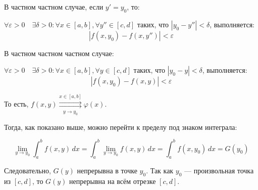 \documentclass{article}
\begin{document}
В частном частном случае, если $y' = y_0$, то:

$\forall \varepsilon > 0 \quad \exists \delta > 0 : \forall x \in [a,b], \forall y'' \in [c,d]$ таких, что $|y_0 - y''| < \delta$, выполняется:
\[
|f(x,y_0) - f(x,y'')| < \varepsilon
\]

В частном частном частном случае:

$\forall \varepsilon > 0 \quad \exists \delta > 0 : \forall x \in [a,b], \forall y \in [c,d]$ таких, что $|y_0 - y| < \delta$, выполняется:
\[
|f(x,y_0) - f(x,y)| < \varepsilon
\]

То есть, \quad $f(x, y) \mathop{\rightrightarrows}\limits^{ x \in [a, b]}_{\,y \to y_0\,} \varphi(x)$.

Тогда, как показано выше, можно перейти к пределу под знаком интеграла:

\[
\lim_{y \to y_0} \int_a^b f(x,y) \, dx = \int_a^b \lim_{y \to y_0} f(x,y) \, dx = \int_a^b f(x,y_0) \, dx = G(y_0)
\]

Следовательно, $G(y)$ непрерывна в точке $y_0$. Так как $y_0$ — произвольная точка из $[c,d]$, то $G(y)$ непрерывна на всём отрезке $[c,d]$.
\end{document}
